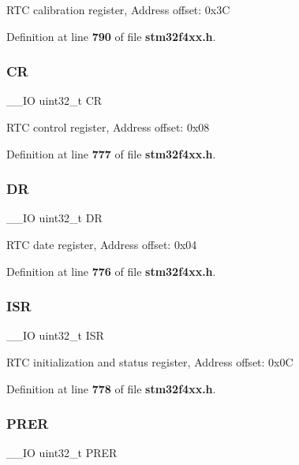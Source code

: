 R\+TC calibration register, Address offset\+: 0x3C 

Definition at line \textbf{ 790} of file \textbf{ stm32f4xx.\+h}.

\mbox{\label{structRTC__TypeDef_ab40c89c59391aaa9d9a8ec011dd0907a}} 
\subsubsection{CR}
{\footnotesize\ttfamily \+\_\+\+\_\+\+IO uint32\+\_\+t CR}

R\+TC control register, Address offset\+: 0x08 

Definition at line \textbf{ 777} of file \textbf{ stm32f4xx.\+h}.

\mbox{\label{structRTC__TypeDef_a3df0d8dfcd1ec958659ffe21eb64fa94}} 
\subsubsection{DR}
{\footnotesize\ttfamily \+\_\+\+\_\+\+IO uint32\+\_\+t DR}

R\+TC date register, Address offset\+: 0x04 

Definition at line \textbf{ 776} of file \textbf{ stm32f4xx.\+h}.

\mbox{\label{structRTC__TypeDef_ab3c49a96815fcbee63d95e1e74f20e75}} 
\subsubsection{I\+SR}
{\footnotesize\ttfamily \+\_\+\+\_\+\+IO uint32\+\_\+t I\+SR}

R\+TC initialization and status register, Address offset\+: 0x0C 

Definition at line \textbf{ 778} of file \textbf{ stm32f4xx.\+h}.

\mbox{\label{structRTC__TypeDef_ac9b4c6c5b29f3461ce3f875eea69f35b}} 
\subsubsection{P\+R\+ER}
{\footnotesize\ttfamily \+\_\+\+\_\+\+IO uint32\+\_\+t P\+R\+ER}

